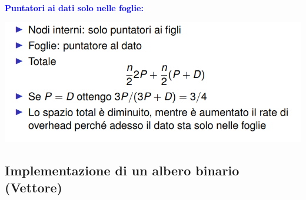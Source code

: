 \newpage
\textbf{\textcolor{blue}{Puntatori ai dati solo nelle foglie:}}
\begin{center}
    \includegraphics[scale = 0.7]{Capitoli/Alberi Binari/Esempi/DatoFigli.png}
\end{center}

\newpage
\subsection{Implementazione di un albero binario (Vettore)}

